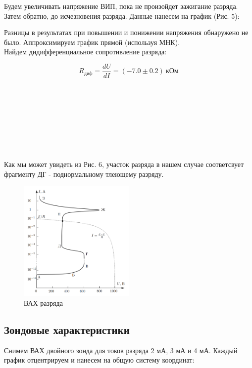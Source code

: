 \documentclass[a4paper]{article}
\begin{document}
\vspace{0.5cm}

Будем увеличивать напряжение ВИП, пока не произойдет зажигание разряда.
Затем обратно, до исчезновения разряда. Данные нанесем на график (Рис. 5):

Разницы в результатах при повышении и понижении напряжения обнаружено не было.
Аппроксимируем график прямой (используя МНК).\\
Найдем дидифференциальное сопротивление разряда:

\begin{equation}
    R_\text{диф} = \frac{dU}{dI} = (-7.0 \pm 0.2) \ \text{кОм}
\end{equation}


\\\
\\\
\\\
\\\
\\\
\\\

Как мы может увидеть из Рис. 6, участок разряда в нашем случае соответсвует 
фрагменту ДГ - поднормальному тлеющему разряду.
\begin{figure}[h!]
    \centering
    \includegraphics[width = 0.50\textwidth]{VAH_REF.png}
    \caption[width = 0.50\textwidth]{ВАХ разряда}
\end{figure}

\newpage

\subsection{Зондовые характеристики}

Снимем ВАХ двойного зонда для токов разряда 2 мА, 3 мА и 4 мА.
Каждый график отцентрируем и нанесем на общую систему координат:
\end{document}
